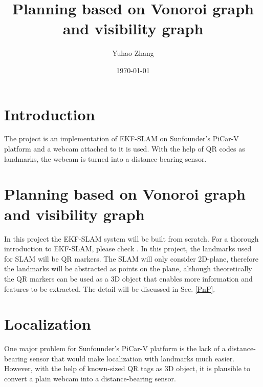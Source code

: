 \documentclass[12pt]{article}
\title{Planning based on Vonoroi graph and visibility graph}
\author{Yuhao Zhang}
\date{\today}
\begin{document}
\maketitle


%
\section{Introduction}
The project is an implementation of EKF-SLAM on Sunfounder's PiCar-V platform and a webcam attached to it is used. With the help of QR codes as landmarks, the webcam is turned into a distance-bearing sensor.
\section{Planning based on Vonoroi graph and visibility graph}
In this project the EKF-SLAM system will be built from scratch. For a thorough introduction to EKF-SLAM, please check \cite{ekf}. In this project, the landmarks used for SLAM will be QR markers. The SLAM will only consider 2D-plane, therefore the landmarks will be abstracted as points on the plane, although theoretically the QR markers can be used as a 3D object that enables more information and features to be extracted. The detail will be discussed in Sec. {\ref{PnP}}.
\label{EKF}
\section{Localization}
One major problem for Sunfounder's PiCar-V platform is the lack of a distance-bearing sensor that would make localization with landmarks much easier. However, with the help of known-sized QR tags as 3D object, it is plausible to convert a plain webcam into a distance-bearing sensor.
\end{document}
